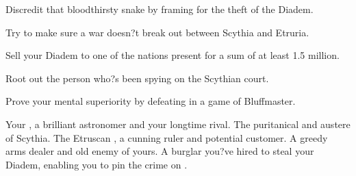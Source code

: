\documentclass[char]{Kos}
\begin{document}
\begin{itemz}[Goals]
\item Discredit that bloodthirsty snake \cArmsDealer{} by framing \cArmsDealer{\them} for the theft of the Diadem.
\item Try to make sure a war doesn?t break out between Scythia and Etruria.
\item Sell your Diadem to one of the nations present for a sum of at least 1.5 million.
\item Root out the person who?s been spying on the Scythian court.
\item Prove your mental superiority by defeating \cArmsDealer{} in a game of Bluffmaster.
\end{itemz}

\begin{contacts}
\contact{\cAnarchist{}} Your \cAnarchist{\sibling}, a brilliant astronomer and your longtime rival.
\contact{\cScythiaQueen{}} The puritanical and austere \cScythiaQueen{\monarch} of Scythia.
\contact{\cEtruriaKing{}} The Etruscan \cEtruriaKing{\monarch}, a cunning ruler and potential customer.
\contact{\cArmsDealer{}} A greedy arms dealer and old enemy of yours.
\contact{\cBurglar{}} A burglar you?ve hired to steal your Diadem, enabling you to pin the crime on \cArmsDealer{}.
\end{contacts}
\end{document}

